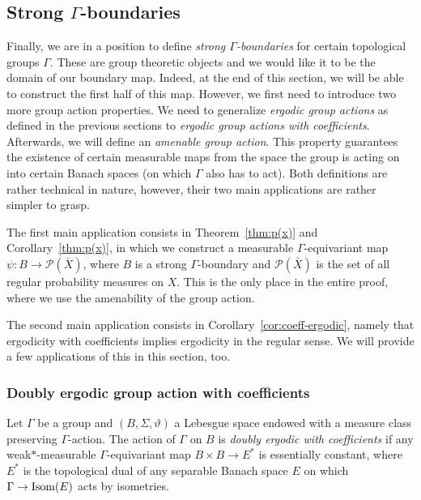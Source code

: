 \subsection{Strong \(\Gamma\)-boundaries}
\label{sec:grp-boundary}

Finally, we are in a position to define \emph{strong \(\Gamma\)-boundaries} for certain topological groups \(\Gamma\). These are group theoretic objects and we would like it to be the domain of our boundary map. Indeed, at the end of this section, we will be able to construct the first half of this map. However, we first need to introduce two more group action properties. We need to generalize \emph{ergodic group actions} as defined in the previous sections to \emph{ergodic group actions with coefficients}. Afterwards, we will define an \emph{amenable group action}. This property guarantees the existence of certain measurable maps from the space the group is acting on into certain Banach spaces (on which \(\Gamma\) also has to act). Both definitions are rather technical in nature, however, their two main applications are rather simpler to grasp.

The first main application consists in Theorem~\ref{thm:p(x)} and Corollary~\ref{thm:p(x)}, in which we construct a measurable \(\Gamma\)-equivariant map  \(\psi\colon B \to \mathcal{P}(\bar X)\), where \(B\) is a strong \(\Gamma\)-boundary and \(\mathcal{P}(\bar X)\) is the set of all regular probability measures on \(X\). This is the only place in the entire proof, where we use the amenability of the group action.

The second main application consists in Corollary~\ref{cor:coeff-ergodic}, namely that ergodicity with coefficients implies ergodicity in the regular sense. We will provide a few applications of this in this section, too.

\subsubsection*{Doubly ergodic group action with coefficients}
\label{sec:ergodic-with-coeff}

\begin{defin}
  Let \(\Gamma\) be a group and \((B, \Sigma, \vartheta)\) a Lebesgue space endowed with a measure class preserving \(\Gamma\)-action. The action of \(\Gamma\) on \(B\) is \emph{doubly ergodic with coefficients} if any weak\(\ast\)-measurable \(\Gamma\)-equivariant map \(B \times B \to E^\ast\) is essentially constant, where \(E^\ast\) is the topological dual of any separable Banach space \(E\) on which \(\Gamma \to \operatorname{Isom}(E)\) acts by isometries.
\end{defin}

